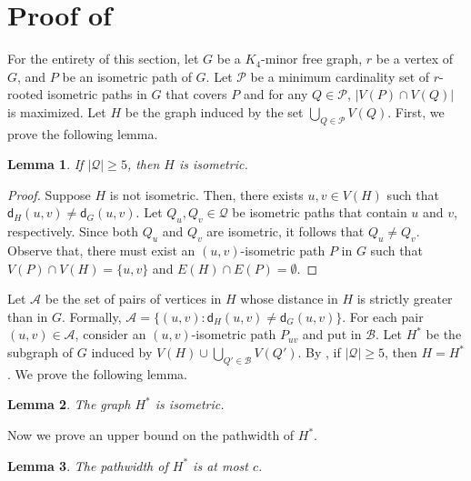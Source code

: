 \documentclass[a4paper]{article}
\newcommand{\distG}[3]{\mathsf{d}_{#1}\left(#2,#3\right)}
\newtheorem{lemma}{Lemma}
\begin{document}
\section{Proof of }


For the entirety of this section, let $G$ be a $K_4$-minor free graph, $r$ be a vertex of $G$, and $P$ be an isometric path of $G$. Let $\mathcal{P}$ be a minimum cardinality set of $r$-rooted isometric paths in $G$ that covers $P$ and for any $Q\in \mathcal{P}$, $|V(P)\cap V(Q)|$ is maximized. Let $H$ be the graph induced by the set $\displaystyle\bigcup\limits_{Q\in \mathcal{P}} V(Q)$. First, we prove the following lemma.

\begin{lemma}\label{lem:1st-isometric}
	If $|\mathcal{Q}| \geq 5$, then $H$ is isometric.
\end{lemma}
\begin{proof}
	Suppose $H$ is not isometric. Then, there exists $u,v\in V(H)$ such that $\distG{H}{u}{v} \neq \distG{G}{u}{v}$. Let $Q_u,Q_v \in \mathcal{Q}$ be isometric paths that contain $u$ and $v$, respectively. Since both $Q_u$ and $Q_v$ are isometric, it follows that $Q_u\neq Q_v$. Observe that, there must exist an $(u,v)$-isometric path $P$ in $G$ such that $V(P)\cap V(H)=\{u,v\}$ and $E(H)\cap E(P)=\emptyset$. 
\end{proof}

Let $\mathcal{A}$ be the set of pairs of vertices in $H$ whose distance in $H$ is strictly greater than in $G$. Formally, $\mathcal{A}=\{(u,v) \colon \distG{H}{u}{v} \neq \distG{G}{u}{v}  \}$.  For each pair $(u,v)\in \mathcal{A}$, consider an $(u,v)$-isometric path $P_{uv}$ and put in $\mathcal{B}$. Let $H^*$ be the subgraph of $G$ induced by $V(H)\cup \displaystyle\bigcup\limits_{Q'\in \mathcal{B}} V(Q')$.  By , if $|\mathcal{Q}|\geq 5$, then $H=H^*$. We prove the following lemma.

\begin{lemma}\label{lem:2nd-isometric}
	The graph $H^*$ is isometric.
\end{lemma}

Now we prove an upper bound on the pathwidth of $H^*$.

\begin{lemma}
	The pathwidth of $H^*$ is at most $c$. 
\end{lemma}



\end{document}
